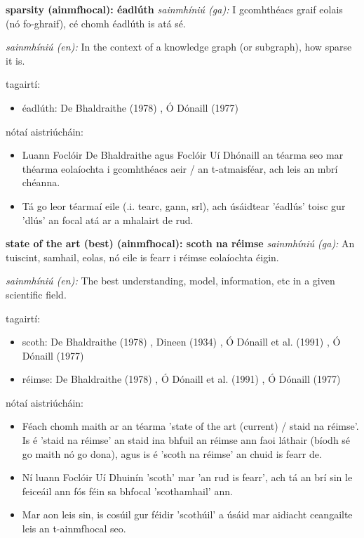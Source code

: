 \documentclass{article}
\begin{document}
\textbf{sparsity (ainmfhocal): éadlúth}
\textit{sainmhíniú (ga):} I gcomhthéacs graif eolais (nó fo-ghraif), cé chomh éadlúth is atá sé.

\textit{sainmhíniú (en):} In the context of a knowledge graph (or subgraph), how sparse it is.

tagairtí:
\begin{itemize}
	\item éadlúth: De Bhaldraithe (1978) \cite{de-bhaldraithe}, Ó Dónaill (1977) \cite{odonaill}
\end{itemize}

nótaí aistriúcháin:
\begin{itemize}
	\item Luann Foclóir De Bhaldraithe agus Foclóir Uí Dhónaill an téarma seo  mar théarma eolaíochta i gcomhthéacs aeir / an t-atmaisféar, ach leis an mbrí chéanna.
	\item Tá go leor téarmaí eile (.i. tearc, gann, srl), ach úsáidtear 'éadlús' toisc gur 'dlús' an focal atá ar a mhalairt de rud.
\end{itemize}


\textbf{state of the art (best) (ainmfhocal): scoth na réimse}
\textit{sainmhíniú (ga):} An tuiscint, samhail, eolas, nó eile is fearr i réimse eolaíochta éigin.

\textit{sainmhíniú (en):} The best understanding, model, information, etc in a given scientific field.

tagairtí:
\begin{itemize}
	\item scoth: De Bhaldraithe (1978) \cite{de-bhaldraithe}, Dineen (1934) \cite{dineen}, Ó Dónaill et al. (1991) \cite{focloir-beag}, Ó Dónaill (1977) \cite{odonaill}
	\item réimse: De Bhaldraithe (1978) \cite{de-bhaldraithe}, Ó Dónaill et al. (1991) \cite{focloir-beag}, Ó Dónaill (1977) \cite{odonaill}
\end{itemize}

nótaí aistriúcháin:
\begin{itemize}
	\item Féach chomh maith ar an téarma 'state of the art (current) / staid na réimse'. Is é 'staid na réimse' an staid ina bhfuil an réimse ann faoi láthair (bíodh sé go maith nó go dona), agus is é 'scoth na réimse' an chuid is fearr de.
	\item Ní luann Foclóir Uí Dhuinín 'scoth' mar 'an rud is fearr', ach tá an brí sin le feiceáil ann fós féin sa bhfocal 'scothamhail' ann.
	\item Mar aon leis sin, is cosúil gur féidir 'scothúil' a úsáid mar aidiacht ceangailte leis an t-ainmfhocal seo.
\end{itemize}
\end{document}
